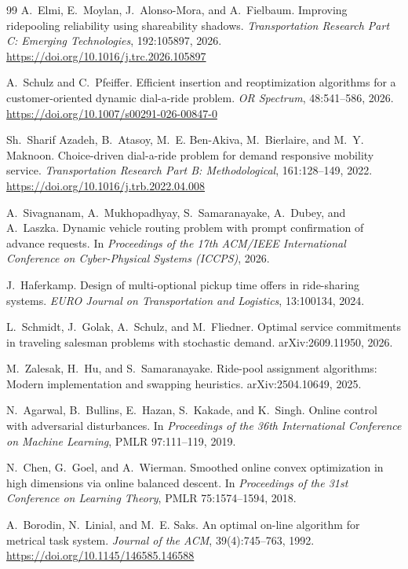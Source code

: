 \begin{thebibliography}{99}
A.~Elmi, E.~Moylan, J.~Alonso-Mora, and A.~Fielbaum.
\newblock Improving ridepooling reliability using shareability shadows.
\newblock \emph{Transportation Research Part C: Emerging Technologies}, 192:105897, 2026.
\newblock \url{https://doi.org/10.1016/j.trc.2026.105897}

A.~Schulz and C.~Pfeiffer.
\newblock Efficient insertion and reoptimization algorithms for a customer-oriented dynamic
dial-a-ride problem.
\newblock \emph{OR Spectrum}, 48:541--586, 2026.
\newblock \url{https://doi.org/10.1007/s00291-026-00847-0}

Sh.~Sharif Azadeh, B.~Atasoy, M.~E. Ben-Akiva, M.~Bierlaire, and M.~Y. Maknoon.
\newblock Choice-driven dial-a-ride problem for demand responsive mobility service.
\newblock \emph{Transportation Research Part B: Methodological}, 161:128--149, 2022.
\newblock \url{https://doi.org/10.1016/j.trb.2022.04.008}

A.~Sivagnanam, A.~Mukhopadhyay, S.~Samaranayake, A.~Dubey, and A.~Laszka.
\newblock Dynamic vehicle routing problem with prompt confirmation of advance requests.
\newblock In \emph{Proceedings of the 17th ACM/IEEE International Conference on Cyber-Physical
Systems (ICCPS)}, 2026.

J.~Haferkamp.
\newblock Design of multi-optional pickup time offers in ride-sharing systems.
\newblock \emph{EURO Journal on Transportation and Logistics}, 13:100134, 2024.

L.~Schmidt, J.~Golak, A.~Schulz, and M.~Fliedner.
\newblock Optimal service commitments in traveling salesman problems with stochastic demand.
\newblock arXiv:2609.11950, 2026.

M.~Zalesak, H.~Hu, and S.~Samaranayake.
\newblock Ride-pool assignment algorithms: Modern implementation and swapping heuristics.
\newblock arXiv:2504.10649, 2025.

N.~Agarwal, B.~Bullins, E.~Hazan, S.~Kakade, and K.~Singh.
\newblock Online control with adversarial disturbances.
\newblock In \emph{Proceedings of the 36th International Conference on Machine Learning},
PMLR 97:111--119, 2019.

N.~Chen, G.~Goel, and A.~Wierman.
\newblock Smoothed online convex optimization in high dimensions via online balanced descent.
\newblock In \emph{Proceedings of the 31st Conference on Learning Theory}, PMLR 75:1574--1594,
2018.

A.~Borodin, N.~Linial, and M.~E. Saks.
\newblock An optimal on-line algorithm for metrical task system.
\newblock \emph{Journal of the ACM}, 39(4):745--763, 1992.
\newblock \url{https://doi.org/10.1145/146585.146588}

\end{thebibliography}
